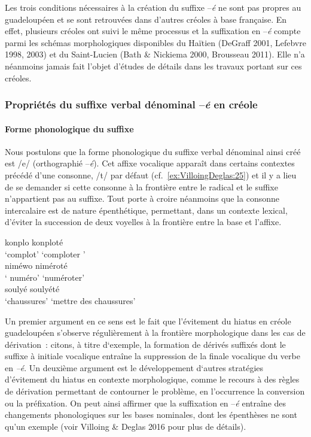 \documentclass[output=paper]{langsci/langscibook}
\begin{document}
Les trois conditions nécessaires à la création du suffixe --\emph{é} ne
sont pas propres au guadeloupéen et se sont retrouvées dans d'autres
créoles à base française. En effet, plusieurs créoles ont suivi le même
processus et la suffixation en --\emph{é} compte parmi les schémas
morphologiques disponibles du Haïtien (DeGraff 2001, Lefebvre 1998,
2003) et du Saint-Lucien (Bath \& Nickiema 2000, Brousseau 2011). Elle
n'a néanmoins jamais fait l'objet d'études de détails dans les travaux
portant sur ces créoles.

\subsubsection{\texorpdfstring{Propriétés du suffixe verbal dénominal
--\emph{é }en
créole}{Propriétés du suffixe verbal dénominal --é en créole}}\label{propriétés-du-suffixe-verbal-dénominal-é-en-créole}

\paragraph{Forme phonologique du
suffixe}\label{forme-phonologique-du-suffixe}

Nous postulons que la forme phonologique du suffixe verbal dénominal
ainsi créé est /e/ (orthographié --\emph{é}). Cet affixe vocalique
apparaît dans certains contextes précédé d'une consonne, /t/ par défaut
(cf.~\ref{ex:VilloingDeglas:25}) et il y a lieu de se demander si cette consonne à la frontière
entre le radical et le suffixe n'appartient pas au suffixe. Tout porte à
croire néanmoins que la consonne intercalaire est de nature
épenthétique, permettant, dans un contexte lexical, d'éviter la
succession de deux voyelles à la frontière entre la base et l'affixe.

\ea \label{ex:VilloingDeglas:25}
  \ea \gll konplo 	\textrightarrow{} konploté\\
  {`complot'} {} {`comploter '}\\
  \ex \gll niméwo 	\textrightarrow{} niméroté\\
  {` numéro'} {} {`numéroter'}\\
  \ex \gll soulyé 	\textrightarrow{} soulyété\\
  {`chaussures'} {} {`mettre des chaussures'}\\
\z\z

Un premier argument en ce sens est le fait que l'évitement du hiatus en
créole guadeloupéen s'observe régulièrement à la frontière morphologique
dans les cas de dérivation~: citons, à titre d`exemple, la formation de
dérivés suffixés dont le suffixe à initiale vocalique entraîne la
suppression de la finale vocalique du verbe en \emph{--é}. Un deuxième
argument est le développement d`autres stratégies d'évitement du hiatus
en contexte morphologique, comme le recours à des règles de dérivation
permettant de contourner le problème, en l'occurrence la conversion ou
la préfixation. On peut ainsi affirmer que la suffixation en --\emph{é}
entraîne des changements phonologiques sur les bases nominales, dont les
épenthèses ne sont qu'un exemple (voir Villoing \& Deglas 2016 pour plus
de détails).
\end{document}

